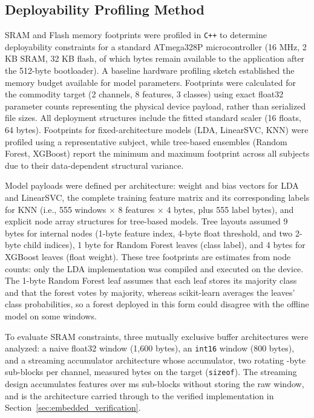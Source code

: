 \documentclass[preprint,12pt]{elsarticle}
\begin{document}
\subsection{Deployability Profiling Method}
SRAM and Flash memory footprints were profiled in \texttt{C++} to determine deployability constraints for a standard ATmega328P microcontroller (16 MHz, 2 KB SRAM, 32 KB flash, of which \appFlashLimit{} bytes remain available to the application after the 512-byte bootloader). A baseline hardware profiling sketch established the memory budget available for model parameters. Footprints were calculated for the commodity target (2 channels, 8 features, 3 classes) using exact float32 parameter counts representing the physical device payload, rather than serialized file sizes. All deployment structures include the fitted standard scaler (16 floats, 64 bytes). Footprints for fixed-architecture models (LDA, LinearSVC, KNN) were profiled using a representative subject, while tree-based ensembles (Random Forest, XGBoost) report the minimum and maximum footprint across all \nSubjects{} subjects due to their data-dependent structural variance.

Model payloads were defined per architecture: weight and bias vectors for LDA and LinearSVC, the complete training feature matrix and its corresponding labels for KNN (i.e., 555 windows $\times$ 8 features $\times$ 4 bytes, plus 555 label bytes), and explicit node array structures for tree-based models. Tree layouts assumed 9 bytes for internal nodes (1-byte feature index, 4-byte float threshold, and two 2-byte child indices), 1 byte for Random Forest leaves (class label), and 4 bytes for XGBoost leaves (float weight). These tree footprints are estimates from node counts: only the LDA implementation was compiled and executed on the device. The 1-byte Random Forest leaf assumes that each leaf stores its majority class and that the forest votes by majority, whereas scikit-learn averages the leaves' class probabilities, so a forest deployed in this form could disagree with the offline model on some windows.

To evaluate SRAM constraints, three mutually exclusive buffer architectures were analyzed: a naive float32 window (1,600 bytes), an \texttt{int16} window (800 bytes), and a streaming accumulator architecture whose accumulator, two rotating \subBlockBytes{}-byte sub-blocks per channel, measured \accumBytesMeasured{} bytes on the target (\texttt{sizeof}). The streaming design accumulates features over \stepMs{} ms sub-blocks without storing the raw window, and is the architecture carried through to the verified implementation in Section~\ref{sec:embedded_verification}.
\end{document}
